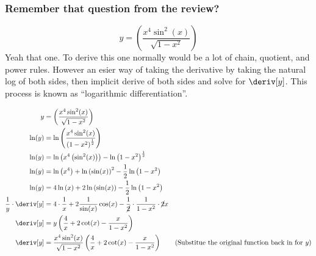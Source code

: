 \subsubsection{Remember that question from the review?}
\begin{equation*}
    y = \left(\dfrac{x^4 \sin^2(x)}{\sqrt{1 - x^2}}\right)
\end{equation*}
Yeah that one. To derive this one normally would be a lot of chain, quotient, and power rules. However an esier way of taking the derivative by taking the natural log of both sides, then implicit derive of both sides and solve for $\deriv[y]$. This process is known as ``logarithmic differentiation''.
\begin{example}
    \begin{align*}
        y &= \left(\dfrac{x^4 \sin^2(x)}{\sqrt{1 - x^2}}\right) \\
        \ln(y) &= \ln\left(\dfrac{x^4 \sin^2(x)}{\left(1 - x^2\right)^{\frac{1}{2}}}\right) \\
        \ln(y) &= \ln\left(x^4 \left(\sin^2(x)\right)\right) - \ln\left(1 - x^2\right)^{\frac{1}{2}} \\
        \ln(y) &= \ln\left(x^4\right) + \ln\left(\sin(x)\right)^2 - \dfrac{1}{2}\ln\left(1 - x^2\right) \\
        \ln(y) &= 4\ln\left(x\right) + 2\ln\left(\sin(x)\right) - \dfrac{1}{2}\ln\left(1 - x^2\right) \\
        \dfrac{1}{y} \cdot \deriv[y] &= 4 \cdot \dfrac{1}{x} + 2 \dfrac{1}{\sin(x)} \cos(x) - \dfrac{1}{\cancel{2}} \cdot \dfrac{1}{1 - x^2} \cdot \cancel{2}x \\
        \deriv[y] &= y \left(\dfrac{4}{x} + 2\cot(x) - \dfrac{x}{1 - x^2}\right) \\
        \deriv[y] &= \dfrac{x^4 \sin^2(x)}{\sqrt{1 - x^2}} \left(\dfrac{4}{x} + 2\cot(x) - \dfrac{x}{1 - x^2}\right) \tag{Substitue the original function back in for $y$}
    \end{align*}
\end{example}
